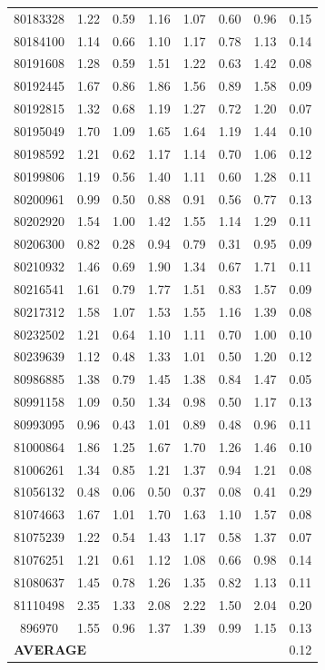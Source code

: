 \begin{small}
\begin{longtable}{|c|c c c|c c c|c|}
80183328 & 1.22 & 0.59 & 1.16 & 1.07 & 0.60 & 0.96 & 0.15 \\
80184100 & 1.14 & 0.66 & 1.10 & 1.17 & 0.78 & 1.13 & 0.14 \\
80191608 & 1.28 & 0.59 & 1.51 & 1.22 & 0.63 & 1.42 & 0.08 \\
80192445 & 1.67 & 0.86 & 1.86 & 1.56 & 0.89 & 1.58 & 0.09 \\
80192815 & 1.32 & 0.68 & 1.19 & 1.27 & 0.72 & 1.20 & 0.07 \\
80195049 & 1.70 & 1.09 & 1.65 & 1.64 & 1.19 & 1.44 & 0.10 \\
80198592 & 1.21 & 0.62 & 1.17 & 1.14 & 0.70 & 1.06 & 0.12 \\
80199806 & 1.19 & 0.56 & 1.40 & 1.11 & 0.60 & 1.28 & 0.11 \\
80200961 & 0.99 & 0.50 & 0.88 & 0.91 & 0.56 & 0.77 & 0.13 \\
80202920 & 1.54 & 1.00 & 1.42 & 1.55 & 1.14 & 1.29 & 0.11 \\
80206300 & 0.82 & 0.28 & 0.94 & 0.79 & 0.31 & 0.95 & 0.09 \\
80210932 & 1.46 & 0.69 & 1.90 & 1.34 & 0.67 & 1.71 & 0.11 \\
80216541 & 1.61 & 0.79 & 1.77 & 1.51 & 0.83 & 1.57 & 0.09 \\
80217312 & 1.58 & 1.07 & 1.53 & 1.55 & 1.16 & 1.39 & 0.08 \\
80232502 & 1.21 & 0.64 & 1.10 & 1.11 & 0.70 & 1.00 & 0.10 \\
80239639 & 1.12 & 0.48 & 1.33 & 1.01 & 0.50 & 1.20 & 0.12 \\
80986885 & 1.38 & 0.79 & 1.45 & 1.38 & 0.84 & 1.47 & 0.05 \\
80991158 & 1.09 & 0.50 & 1.34 & 0.98 & 0.50 & 1.17 & 0.13 \\
80993095 & 0.96 & 0.43 & 1.01 & 0.89 & 0.48 & 0.96 & 0.11 \\
81000864 & 1.86 & 1.25 & 1.67 & 1.70 & 1.26 & 1.46 & 0.10 \\
81006261 & 1.34 & 0.85 & 1.21 & 1.37 & 0.94 & 1.21 & 0.08 \\
\rowcolor{lightgray}81056132 & 0.48 & 0.06 & 0.50 & 0.37 & 0.08 & 0.41 & 0.29 \\
81074663 & 1.67 & 1.01 & 1.70 & 1.63 & 1.10 & 1.57 & 0.08 \\
81075239 & 1.22 & 0.54 & 1.43 & 1.17 & 0.58 & 1.37 & 0.07 \\
81076251 & 1.21 & 0.61 & 1.12 & 1.08 & 0.66 & 0.98 & 0.14 \\
81080637 & 1.45 & 0.78 & 1.26 & 1.35 & 0.82 & 1.13 & 0.11 \\
81110498 & 2.35 & 1.33 & 2.08 & 2.22 & 1.50 & 2.04 & 0.20 \\
896970 & 1.55 & 0.96 & 1.37 & 1.39 & 0.99 & 1.15 & 0.13 \\
\hline
\multicolumn{7}{|l}{\textbf{AVERAGE}} & 0.12 \\
\end{longtable}
\end{small}
\newpage

